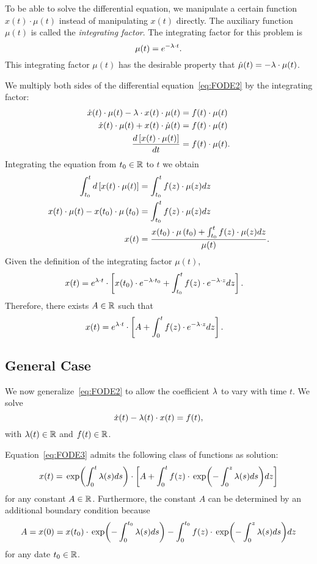 \documentclass[letterpaper,12pt,leqno]{article}
\begin{document}
To be able to solve the differential equation, we manipulate a certain function $x(t)\cdot \mu(t)$ instead of manipulating $x(t)$ directly. The auxiliary function $\mu(t) $ is called the \textit{integrating factor}. The integrating factor for this problem is 
\[\mu(t) =e^{-\lambda \cdot t}.\]
This integrating factor $\mu(t)$ has the desirable property that $\dot{\mu}(t) =-\lambda \cdot \mu(t)$.

We multiply both sides of the differential equation~\eqref{eq:FODE2} by the integrating factor:
\begin{align*}
\dot{x}(t) \cdot \mu(t) -\lambda \cdot x(t)\cdot  \mu(t) & =f(t) \cdot \mu(t)\\
\dot{x}(t) \cdot\mu(t) +x(t) \cdot\dot{\mu}(t) &=f(t)\cdot \mu(t)\\
\frac{d \left[ x(t) \cdot \mu(t) \right]}{d t}& =f(t) \cdot\mu(t).
\end{align*}
Integrating the equation from $t_{0}\in \mathbb{R}$ to $t$ we obtain
\begin{align}
\int_{t_{0}}^{t} d\left[ x(t) \cdot \mu(t) \right]&=\int_{t_{0}}^{t}f(z) \cdot \mu(z) dz\nonumber\\
x(t)\cdot \mu(t)-x(t_{0})\cdot \mu\left( t_{0} \right)&=\int_{t_{0}}^{t}f(z)\cdot  \mu(z) dz\nonumber\\
x(t)& =\frac{x(t_{0}) \cdot \mu\left( t_{0} \right)+\int_{t_{0}}^{t}f(z) \cdot \mu(z) dz}{\mu(t)}.\label{eq:INTER}
\end{align}
Given the definition of the integrating factor $\mu(t)$, 
\begin{align*}
x(t)& =e^{\lambda \cdot t} \cdot \left[ x(t_{0}) \cdot e^{-\lambda\cdot t_{0}}+\int_{t_{0}}^{t}f(z) \cdot e^{-\lambda \cdot z} dz \right].
\end{align*}
Therefore, there exists $A\in \mathbb{R}$ such that 
\begin{align*}
x(t)& =e^{\lambda \cdot t} \cdot \left[ A+\int_{0}^{t}f(z) \cdot e^{-\lambda \cdot z} dz \right].
\end{align*}

\subsection{General Case}

We now generalize~\eqref{eq:FODE2} to allow the coefficient $\lambda$ to vary with time $t$. We solve
\begin{equation}
\dot{x}(t) -\lambda(t) \cdot x(t) =f(t),\label{eq:FODE3}
\end{equation}
with $\lambda(t)\in \mathbb{R}$ and  $f(t)\in \mathbb{R}$. 

Equation~\eqref{eq:FODE3} admits the following class of functions as solution:
\begin{equation}
x(t)=\exp{\int_{0}^{t}\l(s) ds} \cdot \bs{A+\int_{0}^{t}f(z) \cdot \exp{-\int_{0}^{z}\l(s)ds} dz} \label{eq:FODE3sol}
\end{equation}
for any constant $A\in \mathbb{R}$. Furthermore, the constant $A$ can be determined by an additional boundary condition because
\[A=x(0)=x(t_{0})\cdot \exp{-\int_{0}^{t_{0}}\l(s)ds}-\int_{0}^{t_{0}}f(z) \cdot \exp{-\int_{0}^{z}\l(s)ds} dz\]
for any date $t_{0}\in \mathbb{R}$.
\end{document}
